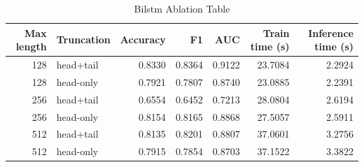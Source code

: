\begin{table}
\caption{Bilstm Ablation Table}
\label{tab:bilstm_ablation_table}
\begin{tabular}{rlrrrrr}
\toprule
Max length & Truncation & Accuracy & F1 & AUC & Train time (s) & Inference time (s) \\
\midrule
128 & head+tail & 0.8330 & 0.8364 & 0.9122 & 23.7084 & 2.2924 \\
128 & head-only & 0.7921 & 0.7807 & 0.8740 & 23.0885 & 2.2391 \\
256 & head+tail & 0.6554 & 0.6452 & 0.7213 & 28.0804 & 2.6194 \\
256 & head-only & 0.8154 & 0.8165 & 0.8868 & 27.5057 & 2.5911 \\
512 & head+tail & 0.8135 & 0.8201 & 0.8807 & 37.0601 & 3.2756 \\
512 & head-only & 0.7915 & 0.7854 & 0.8703 & 37.1522 & 3.3822 \\
\bottomrule
\end{tabular}
\end{table}
